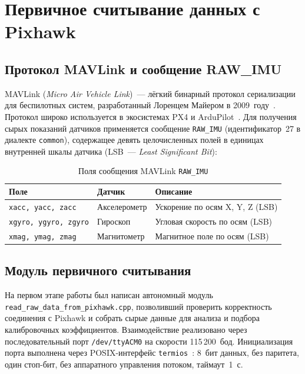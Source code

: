 \newpage
 
\section{Первичное считывание данных с Pixhawk}
 
\subsection{Протокол MAVLink и сообщение RAW\_IMU}
 
MAVLink (\textit{Micro Air Vehicle Link})~--- лёгкий бинарный протокол
сериализации для беспилотных систем, разработанный Лоренцем Майером
в 2009~году~\cite{mavlink_docs}. Протокол широко используется в экосистемах
PX4 и ArduPilot~\cite{px4_docs}. Для получения сырых показаний датчиков
применяется сообщение \texttt{RAW\_IMU} (идентификатор~27 в диалекте
\texttt{common}), содержащее девять целочисленных полей в единицах внутренней
шкалы датчика (LSB~--- \textit{Least Significant Bit}):
 
\begin{table}[H]
\centering
\caption{Поля сообщения MAVLink \texttt{RAW\_IMU}}
\label{tab:rawimu}
\begin{tabularx}{\textwidth}{|>{\centering\arraybackslash}p{4.5cm}|
                               >{\centering\arraybackslash}p{3cm}|
                               >{\centering\arraybackslash}X|}
\hline
\textbf{Поле} & \textbf{Датчик} & \textbf{Описание} \\
\hline
\texttt{xacc, yacc, zacc}   & Акселерометр & Ускорение по осям X, Y, Z (LSB) \\
\hline
\texttt{xgyro, ygyro, zgyro}& Гироскоп     & Угловая скорость по осям (LSB) \\
\hline
\texttt{xmag, ymag, zmag}   & Магнитометр  & Магнитное поле по осям (LSB) \\
\hline
\end{tabularx}
\end{table}
 
\subsection{Модуль первичного считывания}
 
На первом этапе работы был написан автономный модуль
\texttt{read\_raw\_data\_from\_pixhawk.cpp}, позволивший проверить
корректность соединения с Pixhawk и собрать сырые данные для анализа и
подбора калибровочных коэффициентов. Взаимодействие реализовано через
последовательный порт \texttt{/dev/ttyACM0} на скорости 115\,200~бод.
Инициализация порта выполнена через POSIX-интерфейс
\texttt{termios}~\cite{posix_termios}: 8~бит данных, без паритета, один
стоп-бит, без аппаратного управления потоком, таймаут~1~с.
 
